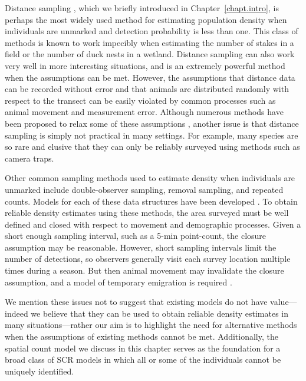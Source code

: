 Distance sampling \citep{buckland_etal:2001}, which we briefly introduced in Chapter~\ref{chapt.intro},
is perhaps the most widely used method for
estimating population density when individuals are unmarked and
detection probability is less than one. This class of methods is known
to work impecibly when estimating the number of stakes in a field or
the number of duck nests in a wetland.
Distance sampling can also work very well in
more interesting situations, and is an extremely powerful method when
the assumptions can be met. However, the assumptions that distance
data can be recorded without error and that animals are distributed
randomly with respect to the transect can be easily violated by
common processes such as animal movement and measurement
error. Although numerous methods have been proposed to
relax some of these assumptions
\citet{royle_etal:2004,borchers_etal:1998,johnson_etal:2010,chandler_etal:2011},
another issue is that distance
sampling is simply not practical in many settings. For example, many
species are so rare and elusive that they can only be reliably
surveyed using methods such as camera traps.

Other common sampling methods used to estimate density when individuals are
unmarked include double-observer sampling, removal sampling, and
repeated counts. Models for each of these data structures have been
developed
\citep{nichols_etal:2000,farnsworth_etal:2002,royle:2004,royle:2004abc,fiske_chandler:2011}. To
obtain reliable density estimates using these
methods, the area surveyed must be well defined and closed with
respect to movement and demographic processes. Given a short enough
sampling interval, such as a 5-min point-count, the closure
assumption may be reasonable. However, short sampling intervals limit
the number of detections, so observers generally visit each survey
location multiple times during a season. But then animal
movement may invalidate the closure assumption, and a model of
temporary emigration is required
\citep{kendall_etal:1997,chandler_etal:2011}.

We mention these issues not to suggest that
existing models do not have value---
indeed we believe that they can be used to obtain reliable density
estimates in many situations---rather our aim is to highlight the need for
alternative methods when the assumptions of existing methods cannot be
met. Additionally, the spatial count model we discuss in this chapter serves as the
foundation for a broad class of SCR models in which all or some of the
individuals cannot be uniquely identified.


